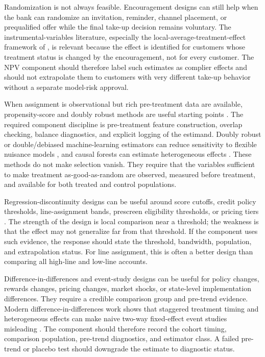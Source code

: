 \documentclass[11pt]{article}
\newcommand{\1}{\mathbf{1}}
\begin{document}
Randomization is not always feasible. Encouragement designs can still help
when the bank can randomize an invitation, reminder, channel placement, or
prequalified offer while the final take-up decision remains voluntary. The
instrumental-variables literature, especially the local-average-treatment-effect
framework of \citet{angristimbensrubin1996iv}, is relevant because the effect
is identified for customers whose treatment status is changed by the
encouragement, not for every customer. The NPV component should therefore label
such estimates as complier effects and should not extrapolate them to customers
with very different take-up behavior without a separate model-risk approval.

When assignment is observational but rich pre-treatment data are available,
propensity-score and doubly robust methods are useful starting points
\citep{rosenbaum1983propensity,imbenswooldridge2009recent}. The required
component discipline is pre-treatment feature construction, overlap checking,
balance diagnostics, and explicit logging of the estimand. Doubly robust or
double/debiased machine-learning estimators can reduce sensitivity to flexible
nuisance models \citep{chernozhukov2018dml}, and causal forests can estimate
heterogeneous effects \citep{wager2018causalforests}. These methods do not make
selection vanish. They require that the variables sufficient to make treatment
as-good-as-random are observed, measured before treatment, and available for
both treated and control populations.

Regression-discontinuity designs can be useful around score cutoffs, credit
policy thresholds, line-assignment bands, prescreen eligibility thresholds, or
pricing tiers \citep{lee2010rd}. The strength of the design is local
comparison near a threshold; the weakness is that the effect may not generalize
far from that threshold. If the component uses such evidence, the response
should state the threshold, bandwidth, population, and extrapolation status.
For line assignment, this is often a better design than comparing all high-line
and low-line accounts.

Difference-in-differences and event-study designs can be useful for policy
changes, rewards changes, pricing changes, market shocks, or state-level
implementation differences. They require a credible comparison group and
pre-trend evidence. Modern difference-in-differences work shows that staggered
treatment timing and heterogeneous effects can make naive two-way fixed-effect
event studies misleading \citep{callaway2021did,sun2021eventstudy}. The
component should therefore record the cohort timing, comparison population,
pre-trend diagnostics, and estimator class. A failed pre-trend or placebo test
should downgrade the estimate to diagnostic status.
\end{document}
